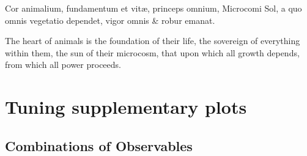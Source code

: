 \begin{savequote}[8cm]
\textlatin{Cor animalium, fundamentum e\longs t vitæ, princeps omnium, Microco\longs mi Sol, a quo omnis vegetatio dependet, vigor omnis \& robur emanat.}

The heart of animals is the foundation of their life, the sovereign of everything within them, the sun of their microcosm, that upon which all growth depends, from which all power proceeds.
\end{savequote}

\chapter{\label{app:tuning}Tuning supplementary plots}

\minitoc

\section{Combinations of Observables}\label{sec:appcombi}


